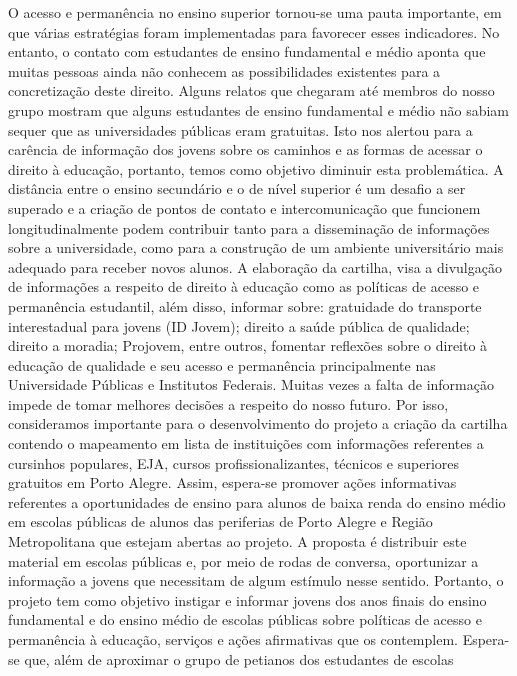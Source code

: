 O acesso e permanência no ensino superior tornou-se uma pauta importante, em que várias
estratégias foram implementadas para favorecer esses indicadores. No entanto, o contato com
estudantes de ensino fundamental e médio aponta que muitas pessoas ainda não conhecem as
possibilidades existentes para a concretização deste direito. Alguns relatos que chegaram até
membros do nosso grupo mostram que alguns estudantes de ensino fundamental e médio não
sabiam sequer que as universidades públicas eram gratuitas. Isto nos alertou para a carência de
informação dos jovens sobre os caminhos e as formas de acessar o direito à educação, portanto,
temos como objetivo diminuir esta problemática. A distância entre o ensino secundário e o de
nível superior é um desafio a ser superado e a criação de pontos de contato e intercomunicação
que funcionem longitudinalmente podem contribuir tanto para a disseminação de informações
sobre a universidade, como para a construção de um ambiente universitário mais adequado para
receber novos alunos. A elaboração da cartilha, visa a divulgação de informações a respeito de
direito à educação como as políticas de acesso e permanência estudantil, além disso, informar
sobre: gratuidade do transporte interestadual para jovens (ID Jovem); direito a saúde pública de
qualidade; direito a moradia; Projovem, entre outros, fomentar reflexões sobre o direito à
educação de qualidade e seu acesso e permanência principalmente nas Universidade Públicas e
Institutos Federais. Muitas vezes a falta de informação impede de tomar melhores decisões a
respeito do nosso futuro. Por isso, consideramos importante para o desenvolvimento do projeto a
criação da cartilha contendo o mapeamento em lista de instituições com informações referentes a
cursinhos populares, EJA, cursos profissionalizantes, técnicos e superiores gratuitos em Porto
Alegre. Assim, espera-se promover ações informativas referentes a oportunidades de ensino para
alunos de baixa renda do ensino médio em escolas públicas de alunos das periferias de Porto
Alegre e Região Metropolitana que estejam abertas ao projeto. A proposta é distribuir este
material em escolas públicas e, por meio de rodas de conversa, oportunizar a informação a
jovens que necessitam de algum estímulo nesse sentido. Portanto, o projeto tem como objetivo
instigar e informar jovens dos anos finais do ensino fundamental e do ensino médio de escolas
públicas sobre políticas de acesso e permanência à educação, serviços e ações afirmativas que os
contemplem. Espera-se que, além de aproximar o grupo de petianos dos estudantes de escolas
